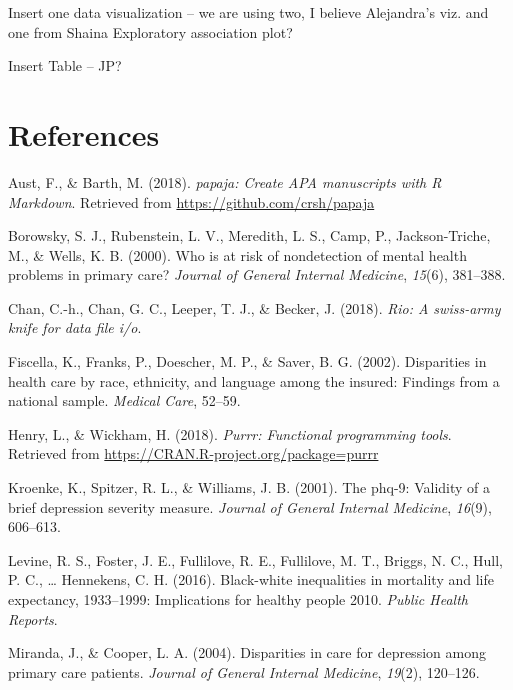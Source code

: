 \documentclass[man]{apa6}
\begin{document}
Insert one data visualization -- we are using two, I believe Alejandra's
viz. and one from Shaina Exploratory association plot?

Insert Table -- JP?

\newpage

\section{References}\label{references}

\begingroup
\setlength{\parindent}{-0.5in} \setlength{\leftskip}{0.5in}

\hypertarget{refs}{}
\hypertarget{ref-R-papaja}{}
Aust, F., \& Barth, M. (2018). \emph{papaja: Create APA manuscripts with
R Markdown}. Retrieved from \url{https://github.com/crsh/papaja}

\hypertarget{ref-borowsky2000risk}{}
Borowsky, S. J., Rubenstein, L. V., Meredith, L. S., Camp, P.,
Jackson-Triche, M., \& Wells, K. B. (2000). Who is at risk of
nondetection of mental health problems in primary care? \emph{Journal of
General Internal Medicine}, \emph{15}(6), 381--388.

\hypertarget{ref-R-rio}{}
Chan, C.-h., Chan, G. C., Leeper, T. J., \& Becker, J. (2018).
\emph{Rio: A swiss-army knife for data file i/o}.

\hypertarget{ref-fiscella2002disparities}{}
Fiscella, K., Franks, P., Doescher, M. P., \& Saver, B. G. (2002).
Disparities in health care by race, ethnicity, and language among the
insured: Findings from a national sample. \emph{Medical Care}, 52--59.

\hypertarget{ref-R-purrr}{}
Henry, L., \& Wickham, H. (2018). \emph{Purrr: Functional programming
tools}. Retrieved from \url{https://CRAN.R-project.org/package=purrr}

\hypertarget{ref-kroenke2001phq}{}
Kroenke, K., Spitzer, R. L., \& Williams, J. B. (2001). The phq-9:
Validity of a brief depression severity measure. \emph{Journal of
General Internal Medicine}, \emph{16}(9), 606--613.

\hypertarget{ref-levine2016black}{}
Levine, R. S., Foster, J. E., Fullilove, R. E., Fullilove, M. T.,
Briggs, N. C., Hull, P. C., \ldots{} Hennekens, C. H. (2016).
Black-white inequalities in mortality and life expectancy, 1933--1999:
Implications for healthy people 2010. \emph{Public Health Reports}.

\hypertarget{ref-miranda2004disparities}{}
Miranda, J., \& Cooper, L. A. (2004). Disparities in care for depression
among primary care patients. \emph{Journal of General Internal
Medicine}, \emph{19}(2), 120--126.
\end{document}
